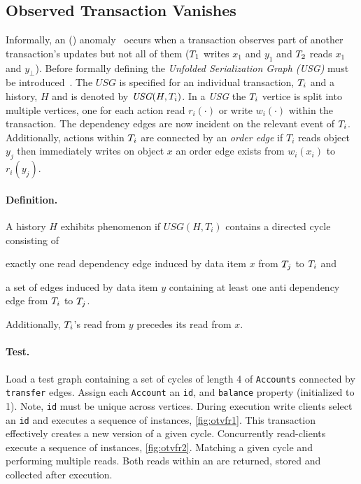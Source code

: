 \subsection{Observed Transaction Vanishes}
\label{sec:observ-trans-vanish}

Informally, an  ()
anomaly~\cite{DBLP:journals/pvldb/BailisDFGHS13} occurs when a transaction
observes part of another transaction's updates but not all of them
(\eg $T_1$ writes $x_1$ and $y_1$ and $T_2$ reads $x_1$ and $y_\bot$).
Before formally defining  the \emph{Unfolded Serialization Graph (USG)}
must be introduced~\cite{adya1999weak}. The $\textit{USG}$ is specified for an
individual transaction, $T_i$ and a history, $H$ and is denoted by
$\textit{USG}(H,T_i)$. In a \emph{USG} the $T_i$ vertice is split into
multiple vertices, one for each action read $r_i(\cdot)$ or  write $w_i(\cdot)$
within the transaction. The dependency edges are now incident on the relevant
event of $T_i$. Additionally, actions within $T_i$ are connected by
an \emph{order edge} \eg if $T_i$ reads object $y_j$ then immediately writes on
object $x$ an order edge exists from $w_i(x_i)$ to $r_i(y_j)$.

\paragraph{Definition.}
A history $H$ exhibits phenomenon  if $\textit{USG}(H,T_i)$
contains a directed cycle consisting of
\begin{enumerate*}[label={(\roman*)}]
  \item exactly one read dependency edge induced by data item $x$ from
  $T_j$ to $T_i$ and
  \item a set of edges induced by data item $y$ containing at least one anti
  dependency edge from $T_i$ to $T_j$.
\end{enumerate*}
Additionally, $T_i$'s read from $y$ precedes its read from $x$.

\paragraph{Test.}
Load a test graph containing a set of cycles of length 4 of \texttt{Accounts}
connected by \texttt{transfer} edges. Assign each \texttt{Account} an \texttt{id},
and \texttt{balance} property (initialized to 1). Note, \texttt{id} must be
unique across vertices. During execution write clients select an \texttt{id} and
executes a sequence of  instances, \autoref{fig:otvfr1}.
This transaction effectively creates a new version of a given cycle. Concurrently
read-clients execute a sequence of  instances, \autoref{fig:otvfr2}.
Matching a given cycle and performing multiple reads. Both reads within an
 are returned, stored and collected after execution.

